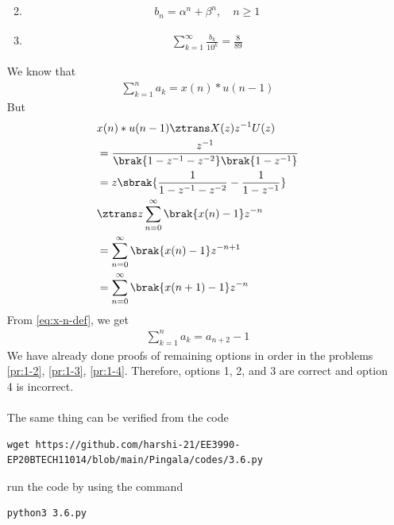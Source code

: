 \documentclass[journal,12pt,twocolumn]{IEEEtran}
\renewcommand\thesection{\arabic{section}}
\begin{document}
\begin{enumerate}[label=\thesection.\arabic*,ref=\thesection.\theenumi]
\begin{enumerate}
\begin{align}
\end{align}
 \item 
\begin{align}
	b_n =\alpha^n + \beta^n, \quad n \ge 1
\end{align}
 \item 
\begin{align}
	\sum_{k=1}^{\infty}\frac{b_k}{10^k} =\frac{8}{89}
\end{align}
\end{enumerate}
\solution We know that
\begin{align}
    \sum_{k = 1}^{n}a_k = x(n)*u(n - 1)
\end{align}
But
\begin{align}
    &x(n)*u(n - 1) \ztrans X(z)z^{-1}U(z) \\
    &= \frac{z^{-1}}{\brak{1 - z^{-1} - z^{-2}}\brak{1 - z^{-1}}} \\
    &= z\sbrak{\frac{1}{1 - z^{-1} - z^{-2}} - \frac{1}{1 - z^{-1}}} \\
    &\ztrans z\sum_{n = 0}^{\infty}\brak{x(n) - 1}z^{-n} \\
    &= \sum_{n = 0}^{\infty}\brak{x(n) - 1}z^{-n + 1} \\
    &= \sum_{n = 0}^{\infty}\brak{x(n + 1) - 1}z^{-n} \\
\end{align}
From \eqref{eq:x-n-def}, we get
\begin{align}
    \sum_{k = 1}^{n}a_k = a_{n+2} - 1
\end{align}
We have already done proofs of remaining options in order in the problems
\eqref{pr:1-2}, \eqref{pr:1-3}, \eqref{pr:1-4}. Therefore, options 1, 2,
and 3 are correct and option 4 is incorrect.\\
\\The same thing can be verified from the code 
\begin{lstlisting}
wget https://github.com/harshi-21/EE3990-EP20BTECH11014/blob/main/Pingala/codes/3.6.py
\end{lstlisting}
run the code by using the command
\begin{lstlisting}
python3 3.6.py
\end{lstlisting}
\end{enumerate}
\end{document}
